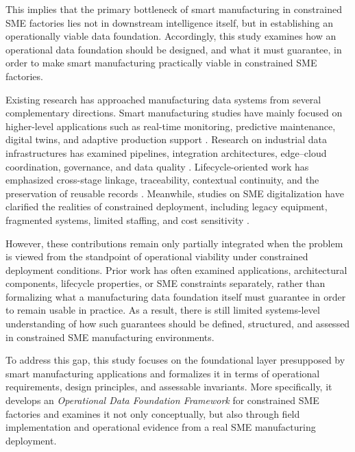 \documentclass[systems,article,submit,pdftex,moreauthors]{Definitions/mdpi}
\begin{document}
This implies that the primary bottleneck of smart manufacturing in constrained SME factories lies not in downstream intelligence itself, but in establishing an operationally viable data foundation. Accordingly, this study examines how an operational data foundation should be designed, and what it must guarantee, in order to make smart manufacturing practically viable in constrained SME factories.

Existing research has approached manufacturing data systems from several complementary directions. Smart manufacturing studies have mainly focused on higher-level applications such as real-time monitoring, predictive maintenance, digital twins, and adaptive production support \cite{song2025smart,tao2017digital,nguyen2025aidriven}. Research on industrial data infrastructures has examined pipelines, integration architectures, edge--cloud coordination, governance, and data quality \cite{ismail2019manufacturing,raptis2019data,morris2020foundations}. Lifecycle-oriented work has emphasized cross-stage linkage, traceability, contextual continuity, and the preservation of reusable records \cite{bernstein2018contextualising,hedberg2017lift,abdelaty2024conceptualizing,zhang2024digitalthread}. Meanwhile, studies on SME digitalization have clarified the realities of constrained deployment, including legacy equipment, fragmented systems, limited staffing, and cost sensitivity \cite{mittal2020adoption,ghobakhloo2019adoption,krishnan2024challenges,huang2025barriers}.

However, these contributions remain only partially integrated when the problem is viewed from the standpoint of operational viability under constrained deployment conditions. Prior work has often examined applications, architectural components, lifecycle properties, or SME constraints separately, rather than formalizing what a manufacturing data foundation itself must guarantee in order to remain usable in practice. As a result, there is still limited systems-level understanding of how such guarantees should be defined, structured, and assessed in constrained SME manufacturing environments.

To address this gap, this study focuses on the foundational layer presupposed by smart manufacturing applications and formalizes it in terms of operational requirements, design principles, and assessable invariants. More specifically, it develops an \emph{Operational Data Foundation Framework} for constrained SME factories and examines it not only conceptually, but also through field implementation and operational evidence from a real SME manufacturing deployment.
\end{document}
